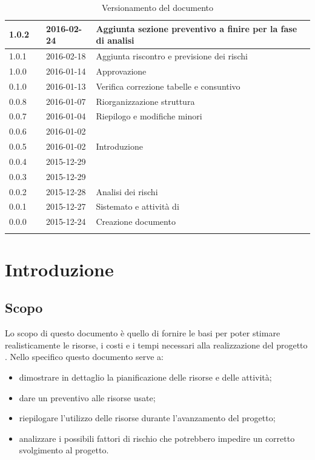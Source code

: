 \documentclass[12pt,a4paper]{article}
\begin{document}
\begin{center}
\begin{longtable}[H]{p{} p{} p{} p{}}
		\midrule
		1.0.2 & \TP{} & 2016-02-24 & Aggiunta sezione preventivo a finire per la fase di analisi \\*
		\midrule
		1.0.1 & \TP{} & 2016-02-18 & Aggiunta riscontro e previsione dei rischi \\*
		\midrule
		1.0.0 & \NDC{} & 2016-01-14 & Approvazione \\*
		\midrule
		0.1.0 & \AVE{} & 2016-01-13 & Verifica correzione tabelle e consuntivo  \FA{} \\*
		\midrule
		0.0.8 & \TP{} & 2016-01-07 & Riorganizzazione struttura \\*
		\midrule
		0.0.7 & \NDC{} & 2016-01-04 & Riepilogo e modifiche minori \\*
		\midrule
		0.0.6 & \WS{} & 2016-01-02 &  \FVV{} \\*
		\midrule
		0.0.5 & \WS{} & 2016-01-02 &  Introduzione \\*
		\midrule
		0.0.4 & \TP{} & 2015-12-29 &  \FPDC{} \\*
		\midrule
		0.0.3 & \TP{} & 2015-12-29 &  \FPA{} \\*
		\midrule
		0.0.2 & \NDC{} & 2015-12-28 &  Analisi dei rischi \\*
		\midrule
		0.0.1 & \NDC{} & 2015-12-27 &  Sistemato \mgls{template} e attività di \FA{} \\*
		\midrule
		0.0.0 & \NDC{} & 2015-12-24 &  Creazione documento \\*
		\bottomrule
		\caption{Versionamento del documento}
		\label{tabVers1}
	\end{longtable}
\end{center}

\newpage
\tableofcontents
\newpage
\listoftables
\listoffigures
\newpage

\section{Introduzione} 

\subsection{Scopo}
Lo scopo di questo documento è quello di fornire le basi per poter stimare realisticamente le risorse, i costi e i tempi necessari alla realizzazione del progetto \textit{\prjL{}}. Nello specifico questo documento serve a:
\begin{itemize}
	\item dimostrare in dettaglio la pianificazione delle risorse e delle attività;
	\item dare un preventivo alle risorse usate;
	\item riepilogare l'utilizzo delle risorse durante l'avanzamento del progetto;
	\item analizzare i possibili fattori di rischio che potrebbero impedire un corretto svolgimento al progetto.
\end{itemize}
\end{document}
